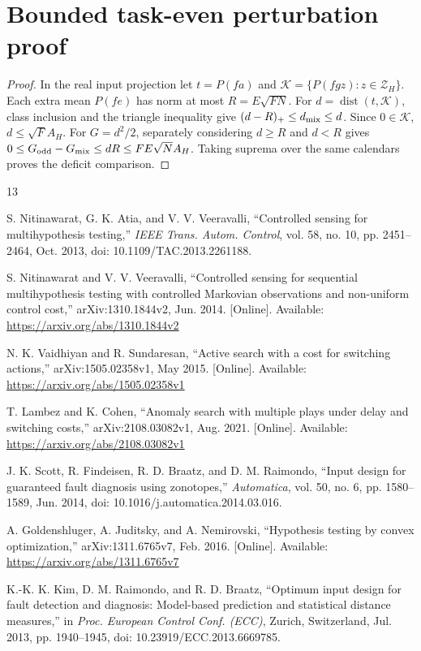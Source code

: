 \section{Bounded task-even perturbation proof}\label{sf:even-proof}
\begin{proof}
In the real input projection let $t=P(fa)$ and
$\mathcal K=\{P(fgz):z\in\mathcal Z_H\}$.
Each extra mean $P(fe)$ has norm at most $R=E\sqrt{FN}$.
For $d=\operatorname{dist}(t,\mathcal K)$, class inclusion and the triangle
inequality give $(d-R)_+\le d_{\rm mix}\le d$.
Since $0\in\mathcal K$, $d\le\sqrt F A_H$.
For $G=d^2/2$, separately considering $d\ge R$ and $d<R$ gives
$0\le G_{\rm odd}-G_{\rm mix}\le dR\le FE\sqrt N A_H$.
Taking suprema over the same calendars proves the deficit comparison.
\end{proof}
\begin{thebibliography}{13}

S. Nitinawarat, G. K. Atia, and V. V. Veeravalli,
``Controlled sensing for multihypothesis testing,''
\emph{IEEE Trans. Autom. Control}, vol. 58, no. 10,
pp. 2451--2464, Oct. 2013, doi: 10.1109/TAC.2013.2261188.

S. Nitinawarat and V. V. Veeravalli,
``Controlled sensing for sequential multihypothesis testing with controlled
Markovian observations and non-uniform control cost,''
arXiv:1310.1844v2, Jun. 2014.
[Online]. Available: \url{https://arxiv.org/abs/1310.1844v2}

N. K. Vaidhiyan and R. Sundaresan,
``Active search with a cost for switching actions,''
arXiv:1505.02358v1, May 2015.
[Online]. Available: \url{https://arxiv.org/abs/1505.02358v1}

T. Lambez and K. Cohen,
``Anomaly search with multiple plays under delay and switching costs,''
arXiv:2108.03082v1, Aug. 2021.
[Online]. Available: \url{https://arxiv.org/abs/2108.03082v1}

J. K. Scott, R. Findeisen, R. D. Braatz, and D. M. Raimondo,
``Input design for guaranteed fault diagnosis using zonotopes,''
\emph{Automatica}, vol. 50, no. 6, pp. 1580--1589, Jun. 2014,
doi: 10.1016/j.automatica.2014.03.016.

A. Goldenshluger, A. Juditsky, and A. Nemirovski,
``Hypothesis testing by convex optimization,''
arXiv:1311.6765v7, Feb. 2016.
[Online]. Available: \url{https://arxiv.org/abs/1311.6765v7}

K.-K. K. Kim, D. M. Raimondo, and R. D. Braatz,
``Optimum input design for fault detection and diagnosis: Model-based prediction
and statistical distance measures,'' in \emph{Proc. European Control Conf. (ECC)},
Zurich, Switzerland, Jul. 2013, pp. 1940--1945,
doi: 10.23919/ECC.2013.6669785.


\end{thebibliography}
